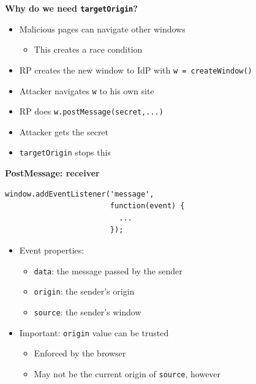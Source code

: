 \documentclass[helvetica]{seminar}
\newcommand{\heading}[1]{%
  \begin{center} 
    \large\bf 
    #1 
  \end{center} 
  \vspace{.4 in}}
\begin{document}
\begin{slide}
\heading{Why do we need \texttt{targetOrigin}?}

\begin{itemize}
\item Malicious pages can navigate other windows
  \begin{itemize}
  \item This creates a race condition
  \end{itemize}

\item RP creates the new window to IdP with \verb^w = createWindow()^
\item Attacker navigates \verb^w^ to his own site
\item RP does \verb^w.postMessage(secret,...)^
\item Attacker gets the secret
\item \verb^targetOrigin^ stops this
\end{itemize}

\end{slide}


\begin{slide}
\heading{PostMessage: receiver}

\begin{verbatim}
window.addEventListener('message',
                        function(event) {
                          ...
                        });
\end{verbatim}

\begin{itemize}
\item Event properties:
  \begin{itemize}
  \item[] \verb^data^: the message passed by the sender
  \item[] \verb^origin^: the sender's origin
  \item[] \verb^source^: the sender's window
  \end{itemize}

\item Important: \verb^origin^ value can be trusted
  \begin{itemize}
  \item Enforced by the browser
  \item May not be the current origin of \verb^source^, however
  \end{itemize}
\end{itemize}
\end{slide}
\end{document}
